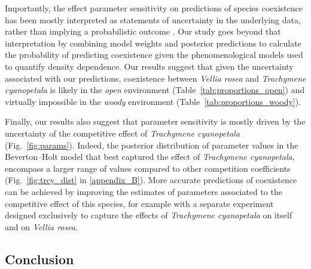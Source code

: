 \begin{refsection}
Importantly, the effect parameter sensitivity on predictions of species coexistence has been mostly interpreted as statements of uncertainty in the underlying data, rather than implying a probabilistic outcome \citep{terry2021natural,matias2018experimental}. Our study goes beyond that interpretation by combining model weights and posterior predictions to calculate the probability of predicting coexistence given the phenomenological models used to quantify density dependence. Our results suggest that given the uncertainty associated with our predictions, coexistence between \textit{Vellia rosea} and \textit{Trachymene cyanopetala} is likely in the \textit{open} environment (Table~\ref{tab:proportions_open}) and virtually impossible in the \textit{woody} environment (Table~\ref{tab:proportions_woody}).


Finally, our results also suggest that parameter sensitivity is mostly driven by the uncertainty of the competitive effect of \textit{Trachymene cyanopetala} (Fig.~\ref{fig:params}). Indeed, the posterior distribution of parameter values in the Beverton--Holt model that best captured the effect of \textit{Trachymene cyanopetala}, encompass a larger range of values compared to other competition coefficients (Fig.~\ref{fig:trcy_dist} in \autoref{appendix_B}). More accurate predictions of coexistence can be achieved by improving the estimates of parameters associated to the competitive effect of this species, for example with a separate experiment designed exclusively to capture the effects of \textit{Trachymene cyanopetala}  on itself and on \textit{Vellia rosea}.


\subsection*{Conclusion}



\end{refsection}
